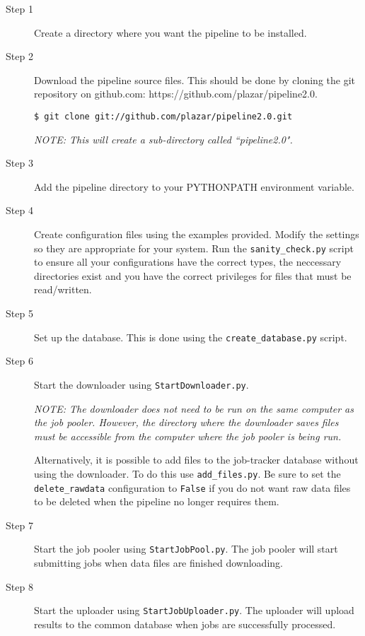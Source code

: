 \begin{description}
    \item[Step 1] Create a directory where you want the pipeline to be installed.

    \item[Step 2] Download the pipeline source files. This should be done by cloning the git repository on github.com: https://github.com/plazar/pipeline2.0.

        \smallskip

        \texttt{\$ git clone git://github.com/plazar/pipeline2.0.git}

        \smallskip
        
        \textit{NOTE: This will create a sub-directory called ``pipeline2.0".} 

    \item[Step 3] Add the pipeline directory to your PYTHONPATH environment variable. 

    \item[Step 4] Create configuration files using the examples provided. Modify the settings so they are appropriate for your system. Run the \texttt{sanity\_check.py} script to ensure all your configurations have the correct types, the neccessary directories exist and you have the correct privileges for files that must be read/written. 

    \item[Step 5] Set up the database. This is done using the \texttt{create\_database.py} script. 

    \item[Step 6] Start the downloader using \texttt{StartDownloader.py}.
        
        \smallskip
        
        \textit{NOTE: The downloader does not need to be run on the same computer as the job pooler. However, the directory where the downloader saves files must be accessible from the computer where the job pooler is being run.}
        
        \smallskip
        
        Alternatively, it is possible to add files to the job-tracker database without using the downloader. To do this use \texttt{add\_files.py}. Be sure to set the \texttt{delete\_rawdata} configuration to \texttt{False} if you do not want raw data files to be deleted when the pipeline no longer requires them. 

    \item[Step 7] Start the job pooler using \texttt{StartJobPool.py}. The job pooler will start submitting jobs when data files are finished downloading. 

    \item[Step 8] Start the uploader using \texttt{StartJobUploader.py}. The uploader will upload results to the common database when jobs are successfully processed.
\end{description}


